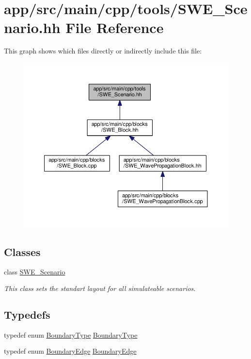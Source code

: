 \hypertarget{tools_2SWE__Scenario_8hh}{}\section{app/src/main/cpp/tools/\+S\+W\+E\+\_\+\+Scenario.hh File Reference}
\label{tools_2SWE__Scenario_8hh}
This graph shows which files directly or indirectly include this file\+:\nopagebreak
\begin{figure}[H]
\begin{center}
\leavevmode
\includegraphics[width=350pt]{tools_2SWE__Scenario_8hh__dep__incl}
\end{center}
\end{figure}
\subsection*{Classes}
\begin{DoxyCompactItemize}
\item 
class \hyperlink{classSWE__Scenario}{S\+W\+E\+\_\+\+Scenario}
\begin{DoxyCompactList}\small\item\em This class sets the standart layout for all simulateable scenarios. \end{DoxyCompactList}\end{DoxyCompactItemize}
\subsection*{Typedefs}
\begin{DoxyCompactItemize}
\item 
typedef enum \hyperlink{scenarios_2SWE__Scenario_8hh_af75d5dd7322fa39ed0af4e7839e600f8}{Boundary\+Type} \hyperlink{tools_2SWE__Scenario_8hh_a0076a482278ddc13ed179c6c76c9b5ad}{Boundary\+Type}
\item 
typedef enum \hyperlink{scenarios_2SWE__Scenario_8hh_aa5e01e3f7df312f7b9b0d02521141fcc}{Boundary\+Edge} \hyperlink{tools_2SWE__Scenario_8hh_a53b43e70a19e542b4c1ab2da9c6bcc0e}{Boundary\+Edge}
\end{DoxyCompactItemize}
